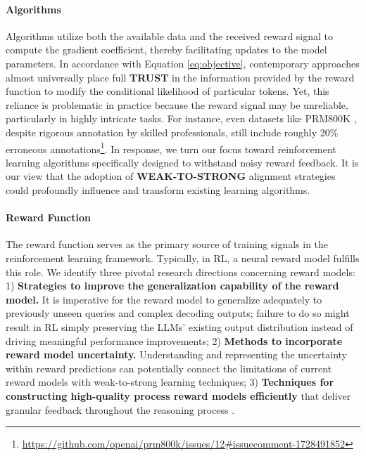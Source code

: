 \begin{itemize}[topsep=0pt]
\begin{itemize}[topsep=0pt]
\paragraph{Algorithms} Algorithms utilize both the available data and the received reward signal to compute the gradient coefficient, thereby facilitating updates to the model parameters. In accordance with Equation \ref{eq:objective}, contemporary approaches almost universally place full \textbf{TRUST} in the information provided by the reward function to modify the conditional likelihood of particular tokens. Yet, this reliance is problematic in practice because the reward signal may be unreliable, particularly in highly intricate tasks. For instance, even datasets like PRM800K \citep{lightman2023let}, despite rigorous annotation by skilled professionals, still include roughly 20\% erroneous annotations\footnote{\url{https://github.com/openai/prm800k/issues/12\#issuecomment-1728491852}}. In response, we turn our focus toward reinforcement learning algorithms specifically designed to withstand noisy reward feedback. It is our view that the adoption of \textbf{WEAK-TO-STRONG} \citep{burns2023weak} alignment strategies could profoundly influence and transform existing learning algorithms.

\paragraph{Reward Function} The reward function serves as the primary source of training signals in the reinforcement learning framework. Typically, in RL, a neural reward model fulfills this role. We identify three pivotal research directions concerning reward models: 1) \textbf{Strategies to improve the generalization capability of the reward model.} It is imperative for the reward model to generalize adequately to previously unseen queries and complex decoding outputs; failure to do so might result in RL simply preserving the LLMs’ existing output distribution instead of driving meaningful performance improvements; 2) \textbf{Methods to incorporate reward model uncertainty.} Understanding and representing the uncertainty within reward predictions can potentially connect the limitations of current reward models with weak-to-strong learning techniques; 3) \textbf{Techniques for constructing high-quality process reward models efficiently} that deliver granular feedback throughout the reasoning process \citep{lightman2023let,wang2023math}.


\end{itemize}
\end{itemize}
